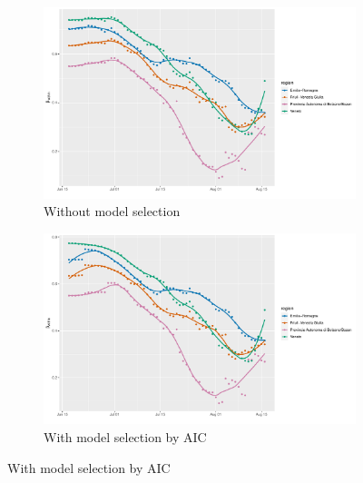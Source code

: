 \documentclass[12pt]{article}
\begin{document}
	\begin{figure}[H]
	    \centering
	    \begin{subfigure}{\textwidth}
	      \centering
	      \includegraphics[width=0.92\linewidth]{output/model_within_lag14_betawithin_Nord-Est_rolling.pdf}
	      \caption{Without model selection}
	      \label{fig:beta_within_over_time_nordest_regular}
	    \end{subfigure}\newline
	    \begin{subfigure}{\textwidth}
	      \centering
	      \includegraphics[width=0.92\linewidth]{output/model_within_lag14_betawithin_Nord-Est_aic_rolling.pdf}
	      \caption{With model selection by AIC}
	      \label{fig:beta_within_over_time_nordest_aic}
	    \end{subfigure}
	\end{figure}
\end{document}
